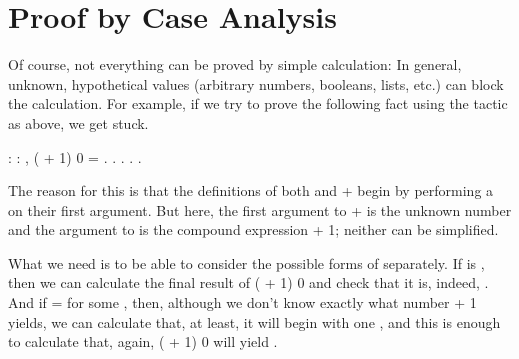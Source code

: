 \documentclass[12pt]{report}
\begin{document}
\section{Proof by Case Analysis}



 Of course, not everything can be proved by simple
    calculation: In general, unknown, hypothetical values (arbitrary
    numbers, booleans, lists, etc.) can block the calculation.  
    For example, if we try to prove the following fact using the 
     tactic as above, we get stuck. \begin{coqdoccode}
\coqdocemptyline
\coqdocnoindent
{}  : \coqdockw{\ensuremath{\forall}}  : ,\coqdoceol
\coqdocindent{1.00em}
 ( + 1) 0 = .\coqdoceol
\coqdocnoindent
{}.\coqdoceol
\coqdocindent{1.00em}
 .\coqdoceol
\coqdocindent{1.00em}
. \coqdocnoindent
{}.\coqdoceol
\coqdocemptyline
\end{coqdoccode}
The reason for this is that the definitions of both
     and + begin by performing a  on their first
    argument.  But here, the first argument to + is the unknown
    number  and the argument to  is the compound
    expression  + 1; neither can be simplified.


    What we need is to be able to consider the possible forms of 
    separately.  If  is , then we can calculate the final result
    of  ( + 1) 0 and check that it is, indeed, .
    And if  =   for some , then, although we don't know
    exactly what number  + 1 yields, we can calculate that, at
    least, it will begin with one , and this is enough to calculate
    that, again,  ( + 1) 0 will yield .
\end{document}
